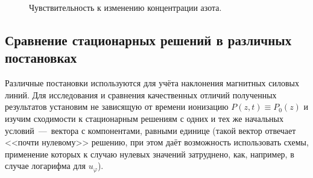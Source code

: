 \documentclass[14pt, a4paper, fleqn]{extarticle}
\begin{document}
\begin{figure}
\caption{Чувствительность к изменению концентрации азота.}
\end{figure}








\subsection{Сравнение стационарных решений в различных постановках}


Различные постановки используются для учёта наклонения магнитных силовых линий. Для исследования и сравнения качественных отличий полученных результатов установим не зависящую от времени ионизацию $P(z, t) \equiv P_0(z)$ и изучим сходимости к стационарным решениям с одних и тех же начальных условий~---~вектора с компонентами, равными единице (такой вектор отвечает <<почти нулевому>> решению, при этом даёт возможность использовать схемы, применение которых к случаю нулевых значений затруднено, как, например, в случае логарифма для $u_\varphi$). 
\end{document}
